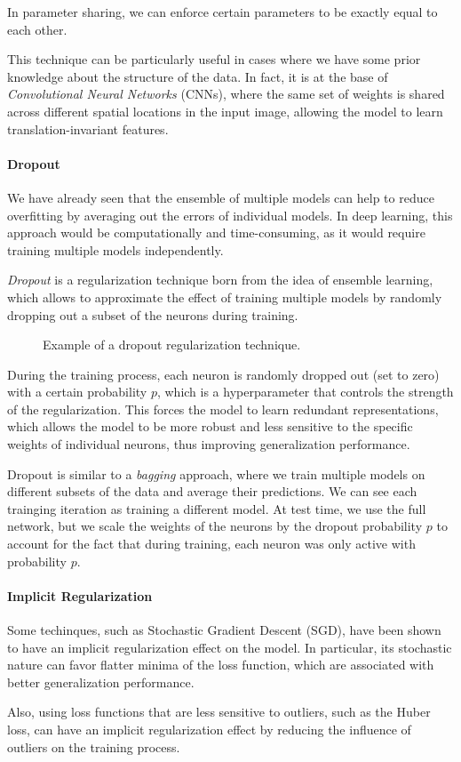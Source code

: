 In parameter sharing, we can enforce certain parameters to be exactly equal to each other.

This technique can be particularly useful in cases where we have some prior knowledge about the structure of the data.
In fact, it is at the base of \textit{Convolutional Neural Networks} (CNNs), where the same set of weights is shared across different spatial locations in the input image, 
allowing the model to learn translation-invariant features.


\paragraph{Dropout}
We have already seen that the ensemble of multiple models can help to reduce overfitting by averaging out the errors of individual models.
In deep learning, this approach would be computationally and time-consuming, as it would require training multiple models independently.

\textit{Dropout} is a regularization technique born from the idea of ensemble learning, which allows to approximate the effect of training 
multiple models by randomly dropping out a subset of the neurons during training.
\begin{figure}[H]
    \centering
    
    \caption{Example of a dropout regularization technique.}
    \label{fig:dropout}
\end{figure}
During the training process, each neuron is randomly dropped out (set to zero) with a certain probability $p$, which is a hyperparameter that controls the strength of the regularization.
This forces the model to learn redundant representations, which allows the model to be more robust and less sensitive to the specific weights of individual neurons, 
thus improving generalization performance.

Dropout is similar to a \textit{bagging} approach, where we train multiple models on different subsets of the data and average their predictions.
We can see each trainging iteration as training a different model. At test time, we use the full network, but we scale the weights of the neurons by the dropout probability $p$ to account for the fact that during training, each neuron was only active with probability $p$.
\paragraph{Implicit Regularization}
Some techinques, such as Stochastic Gradient Descent (SGD), have been shown to have an implicit regularization effect on the model.
In particular, its stochastic nature can favor flatter minima of the loss function, which are associated with better generalization performance.

Also, using loss functions that are less sensitive to outliers, such as the Huber loss, can have an implicit regularization effect by reducing the influence of outliers on the training process.